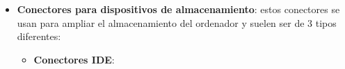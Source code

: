 \begin{itemize}
    \begin{itemize}
        \item \textbf{Conectores para dispositivos de almacenamiento}: estos conectores se usan para ampliar el almacenamiento del ordenador y suelen ser de 3 tipos diferentes:

        \begin{itemize}
            \item \textbf{Conectores IDE}:
        \end{itemize}
    \end{itemize}
\end{itemize}





\glsaddall
\printglossaries


\newpage
{}



